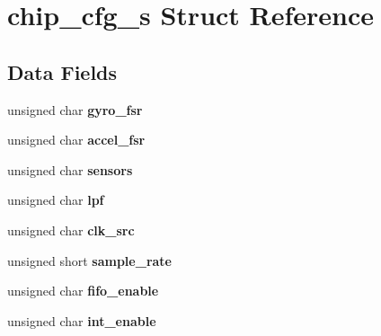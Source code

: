 \hypertarget{structchip__cfg__s}{}\section{chip\+\_\+cfg\+\_\+s Struct Reference}
\label{structchip__cfg__s}
\subsection*{Data Fields}
\begin{DoxyCompactItemize}
\item 
unsigned char {\bfseries gyro\+\_\+fsr}\hypertarget{structchip__cfg__s_abae9129fae33706b5f73b2b1867fcc89}{}\label{structchip__cfg__s_abae9129fae33706b5f73b2b1867fcc89}

\item 
unsigned char {\bfseries accel\+\_\+fsr}\hypertarget{structchip__cfg__s_a97d5de8aa2fab5cc81ca2180130fc6ac}{}\label{structchip__cfg__s_a97d5de8aa2fab5cc81ca2180130fc6ac}

\item 
unsigned char {\bfseries sensors}\hypertarget{structchip__cfg__s_aaa21c01566947e7007476657cb614e3f}{}\label{structchip__cfg__s_aaa21c01566947e7007476657cb614e3f}

\item 
unsigned char {\bfseries lpf}\hypertarget{structchip__cfg__s_a0a4067140c6a3704b4312ba62b77aadb}{}\label{structchip__cfg__s_a0a4067140c6a3704b4312ba62b77aadb}

\item 
unsigned char {\bfseries clk\+\_\+src}\hypertarget{structchip__cfg__s_a2ac4d2f6d885669a21842e13dd3c5241}{}\label{structchip__cfg__s_a2ac4d2f6d885669a21842e13dd3c5241}

\item 
unsigned short {\bfseries sample\+\_\+rate}\hypertarget{structchip__cfg__s_a1aa4e026c4d2f691506f2d713a405aea}{}\label{structchip__cfg__s_a1aa4e026c4d2f691506f2d713a405aea}

\item 
unsigned char {\bfseries fifo\+\_\+enable}\hypertarget{structchip__cfg__s_a1f258910658cfcf4bed56c0de8637441}{}\label{structchip__cfg__s_a1f258910658cfcf4bed56c0de8637441}

\item 
unsigned char {\bfseries int\+\_\+enable}\hypertarget{structchip__cfg__s_ab0cc290f4f43cd8a8b6562a97f540493}{}\label{structchip__cfg__s_ab0cc290f4f43cd8a8b6562a97f540493}


\end{DoxyCompactItemize}
